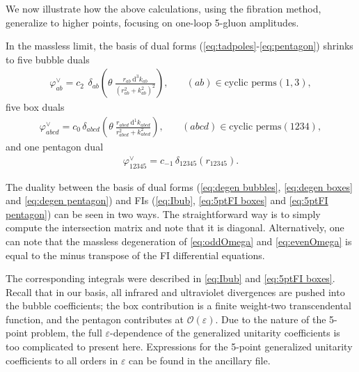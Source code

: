 \documentclass[11pt]{article}
\renewcommand{\d}{\text{d}}
\renewcommand{\O}{\mathcal{O}}
\newcommand{\vphi}{\varphi}
\newcommand{\vep}{\varepsilon}
\renewcommand{\th}{\theta}
\begin{document}
We now illustrate how the above calculations, using the fibration method, generalize to higher points, focusing on one-loop 5-gluon amplitudes.

In the massless limit, the basis of dual forms (\eqref{eq:tadpoles}-\eqref{eq:pentagon}) shrinks to five bubble duals
\begin{align}
	\label{eq:degen bubbles}
	\vphi^\vee_{ab} = c_{2}\,\ \delta_{ab} \left( \th\ \frac{ r_{ab}\ \d^3 k_{ab} }{ (r_{ab}^2 + k^2_{ab})^2 } \right),
	&\quad  (ab) \in \text{cyclic perms}(1,3),
\end{align}
five box duals 
\begin{align}
	\label{eq:degen boxes}
	\vphi^\vee_{abcd} = c_0\, \delta_{abcd} \left( \th\ \frac{ r_{abcd}\ \d^1 k_{abcd} }{ r_{abcd}^2 + k^2_{abcd} } \right),
	&\quad (abcd) \in \text{cyclic perms}(1234),
\end{align}
and one pentagon dual
\begin{align}
	\label{eq:degen pentagon}
	\vphi^\vee_{12345} = c_{-1}\, \delta_{12345} \left( r_{12345} \right) .
\end{align}

The duality between the basis of dual forms (\eqref{eq:degen bubbles}, \eqref{eq:degen boxes} and \eqref{eq:degen pentagon}) and FIs (\eqref{eq:Ibub}, \eqref{eq:5ptFI boxes} and \eqref{eq:5ptFI pentagon}) can be seen in two ways. The straightforward way is to simply compute the intersection matrix and note that it is diagonal. Alternatively, one can note that the massless degeneration of \eqref{eq:oddOmega} and \eqref{eq:evenOmega} is equal to the minus transpose of the FI differential equations.

The corresponding integrals were described in \eqref{eq:Ibub} and \eqref{eq:5ptFI boxes}.
Recall that in our basis, all infrared and ultraviolet divergences are pushed into the bubble coefficients; the box contribution is a finite weight-two transcendental function, and the pentagon contributes at $\O(\vep)$.
Due to the nature of the 5-point problem, the full $\vep$-dependence of the generalized unitarity coefficients is too complicated to present here.
Expressions for the 5-point generalized unitarity coefficients to all orders in $\vep$ can be found in the ancillary file.  
\end{document}
